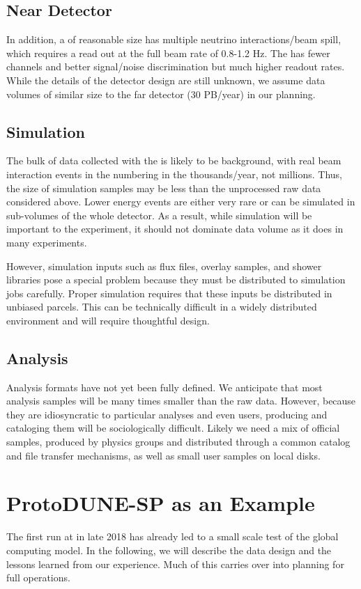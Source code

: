 \subsection{Near Detector}
In addition, a  of reasonable size has multiple neutrino interactions/beam spill, which requires a read out at the full beam rate of 0.8-1.2 Hz.
The  has fewer channels and better signal/noise discrimination but much higher readout rates.  While the details of the detector design are still unknown, we assume data volumes of similar size to the far detector (30 PB/year) in our planning.

\subsection{Simulation}
The bulk of data collected with the  is likely to be background, with real beam interaction events in the  numbering in the thousands/year, not millions. Thus, the size of simulation samples may be less than the unprocessed raw data considered above.  Lower energy events are either very rare or can be simulated in sub-volumes of the whole detector.  As a result, while simulation will be important to the experiment, it should not dominate data volume as it does in many experiments.  

However, simulation inputs such as flux files, overlay samples, and shower libraries pose a special problem because they must be distributed to simulation jobs carefully.  Proper simulation requires that these inputs be distributed in unbiased parcels.  This can be technically difficult in a widely distributed environment and will require thoughtful design. 

\subsection{Analysis}

Analysis formats have not yet been fully defined.  We anticipate that most analysis samples will be many times smaller than the raw data.  However, because they are idiosyncratic to particular analyses and even users,  producing and cataloging them will be sociologically difficult. 
Likely we need a mix of official samples, produced by physics groups and distributed through a common catalog and file transfer mechanisms, as well as small user samples on local disks. 


\section{ProtoDUNE-SP as an Example}
\label{ch:exec-comp-proto-SP}
The first   run at  in late 2018 has already led to a small scale test of the global computing model.  In the following, we will describe the  data design and the lessons learned from our experience. Much of this carries over into planning for full  operations. 


